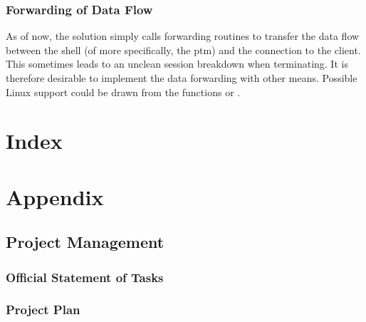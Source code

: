 \documentclass[10pt,a4paper,titlepage,twoside,english,final]{zhawreprt}
\begin{document}
\subsection{Forwarding of Data Flow}\label{ssec:ForwardingOfDataFlow}
As of now, the solution simply calls forwarding routines to transfer the data flow between the \gls{shell} (of more specifically, the \gls{ptm}) and the connection to the client.
This sometimes leads to an unclean session breakdown when terminating.
It is therefore desirable to implement the data forwarding with other means.
Possible \gls{Linux} support could be drawn from the functions \cite{select} or \cite{poll}.


\chapter{Index}\label{chp:Index}
\label{sec:Bibliography}
\newpage
\printglossary\label{sec:Glossary}
\newpage
\listoffigures\label{sec:ListOfFigures}
\newpage
\lstlistoflistings\label{sec:ListOfListings}
\newpage
\printglossary[title=SymbolGlossary,type=symbols]\label{sec:SymbolGlossary}
\newpage
\printglossary[title=Acronym Glossary,type=\acronymtype]\label{sec:AcronymGlossary}
\newpage
\printindex\label{sec:Index}

\appendix
\chapter{Appendix}\label{chp:Appendix}
\section{Project Management}\label{sec:ProjectManagement}

\subsection{Official Statement of Tasks}\label{ssec:OfficialStatementOfTasks}

\subsection{Project Plan}\label{ssec:ProjectPlan}


\end{document}
